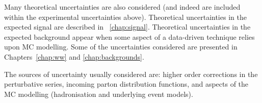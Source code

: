 Many theoretical uncertainties are also considered (and indeed are included within the 
experimental uncertainties above). Theoretical uncertainties in the expected signal are 
described in \Chapter~\ref{chap:signal}. Theoretical uncertainties in the expected 
background appear when some aspect of a data-driven technique relies upon MC modelling. 
Some of the uncertainties considered are presented in Chapters~\ref{chap:ww} and 
\ref{chap:backgrounds}.

The sources of uncertainty usually considered are: higher order corrections in the 
perturbative series, incoming parton distribution functions, and aspects of the MC modelling 
(\eg hadronisation and underlying event models).

